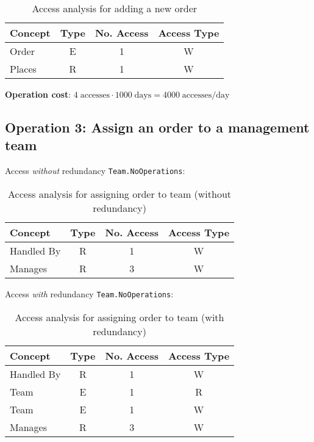     \begin{table}[h!]
    \centering
    \caption{Access analysis for adding a new order}
    \begin{tabular}{|l|c|c|c|}
    \hline
    \textbf{Concept} & \textbf{Type} & \textbf{No. Access} & \textbf{Access Type} \\
    \hline
    Order   & E & 1 & W \\
    \hline
    Places  & R & 1 & W \\
    \hline
    \end{tabular}
    \end{table}
    
    \textbf{Operation cost}: $4 \; \text{accesses} \cdot 1000 \; \text{days} = 4000 \; \text{accesses/day}$
    
    \subsection*{Operation 3: Assign an order to a management team}
    
    Access \textit{without} redundancy \texttt{Team.NoOperations}:
    
    \begin{table}[h!]
    \centering
    \caption{Access analysis for assigning order to team (without redundancy)}
    \begin{tabular}{|l|c|c|c|}
    \hline
    \textbf{Concept} & \textbf{Type} & \textbf{No. Access} & \textbf{Access Type} \\
    \hline
    Handled By & R & 1 & W \\
    \hline
    Manages    & R & 3 & W \\
    \hline
    \end{tabular}
    \end{table}
    
    Access \textit{with} redundancy \texttt{Team.NoOperations}:
    
    \begin{table}[h!]
    \centering
    \caption{Access analysis for assigning order to team (with redundancy)}
    \begin{tabular}{|l|c|c|c|}
    \hline
    \textbf{Concept} & \textbf{Type} & \textbf{No. Access} & \textbf{Access Type} \\
    \hline
    Handled By & R & 1 & W \\
    \hline
    Team       & E & 1 & R \\
    \hline
    Team       & E & 1 & W \\
    \hline
    Manages    & R & 3 & W \\
    \hline
    \end{tabular}
    \end{table}
    
